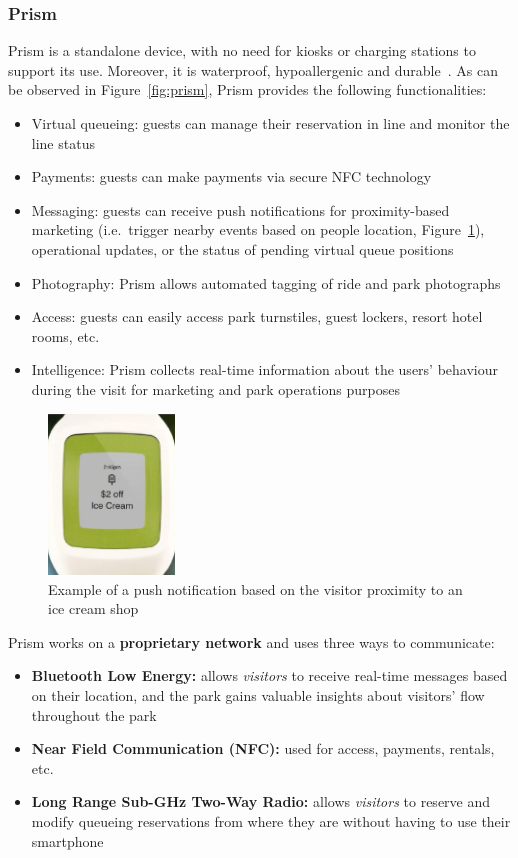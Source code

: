 \subsubsection*{Prism}
Prism is a standalone device, with no need for kiosks or charging stations to support its use.
Moreover, it is waterproof, hypoallergenic and durable~\cite{prism-desc}.
As can be observed in Figure~\ref{fig:prism}, Prism provides the following functionalities:
\begin{itemize}
	\item Virtual queueing: guests can manage their reservation in line and monitor the line status
	\item Payments: guests can make payments via secure NFC technology
	\item Messaging: guests can receive push notifications for proximity-based marketing (i.e.\ trigger nearby events based on people location, Figure~\ref{fig:prism-icecream}), operational updates, or the status of pending virtual queue positions
	\item Photography: Prism allows automated tagging of ride and park photographs
	\item Access: guests can easily access park turnstiles, guest lockers, resort hotel rooms, etc.
	\item Intelligence: Prism collects real-time information about the users' behaviour during the visit for marketing and park operations purposes
\end{itemize}

\begin{figure}[H]
	\centering
	\includegraphics[width=0.3\textwidth]{img/prism-icecream}
	\caption{Example of a push notification based on the visitor proximity to an ice cream shop}
	\label{fig:prism-icecream}
\end{figure}

Prism works on a \textbf{proprietary network} and uses three ways to communicate:
\begin{itemize}
	\item \textbf{Bluetooth Low Energy:} allows \textit{visitors} to receive real-time messages based on their location, and the park gains valuable insights about visitors' flow throughout the park
	\item \textbf{Near Field Communication (NFC):} used for access, payments, rentals, etc.
	\item \textbf{Long Range Sub-GHz Two-Way Radio:} allows \textit{visitors} to reserve and modify queueing reservations from where they are without having to use their smartphone
\end{itemize}

